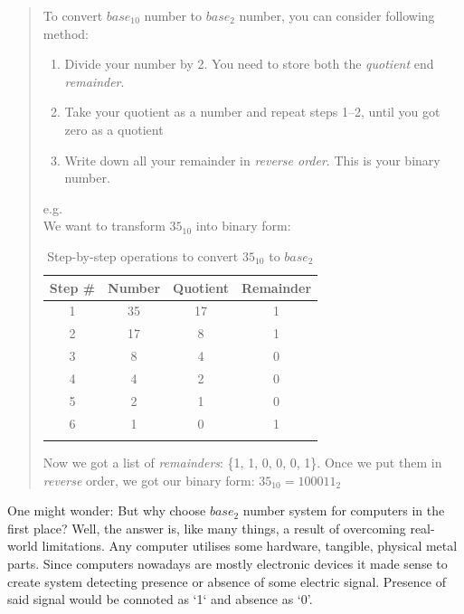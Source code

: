 \documentclass{report}
\begin{document}
            \begin{quote}
                To convert $base_{10}$ number to $base_{2}$ number, you can consider following method:
                \begin{enumerate}
                    \item Divide your number by 2. You need to store both the \emph{quotient} end \emph{remainder}.
                    \item Take your quotient as a number and repeat steps 1--2, until you got zero as a quotient
                    \item Write down all your remainder in \emph{reverse order}. This is your binary number.
                \end{enumerate}

                e.g.\\
                We want to transform $35_{10}$ into binary form:
                \begin{table}[h]
                    \centering                
                    \begin{longtable}{|c|c|c|c|}
                        \hline
                        Step \# & Number & Quotient & Remainder \\\hline
                        1 & 35 & 17 & 1 \\\hline
                        2 & 17 & 8 & 1 \\\hline
                        3 & 8 & 4 & 0 \\\hline
                        4 & 4 & 2 & 0 \\\hline
                        5 & 2 & 1 & 0 \\\hline
                        6 & 1 & 0 & 1 \\\hline
                        \caption{Step-by-step operations to convert $35_{10}$ to $base_2$}

                    \end{longtable}
                \end{table}

                Now we got a list of \emph{remainders}: \{1, 1, 0, 0, 0, 1\}. Once we put them in \emph{reverse} order, we got our binary form: $35_{10} = 100011_2$
            \end{quote}
            
    
            One might wonder: But why choose $base_2$ number system for computers in the first place? Well, the answer is, like many things, a result of overcoming
            real-world limitations. Any computer utilises some hardware, tangible, physical metal parts. Since computers nowadays are mostly electronic devices 
            it made sense to create system detecting presence or absence of some electric signal. Presence of said signal would be connoted as `1` and absence as `0'. \par
\end{document}
